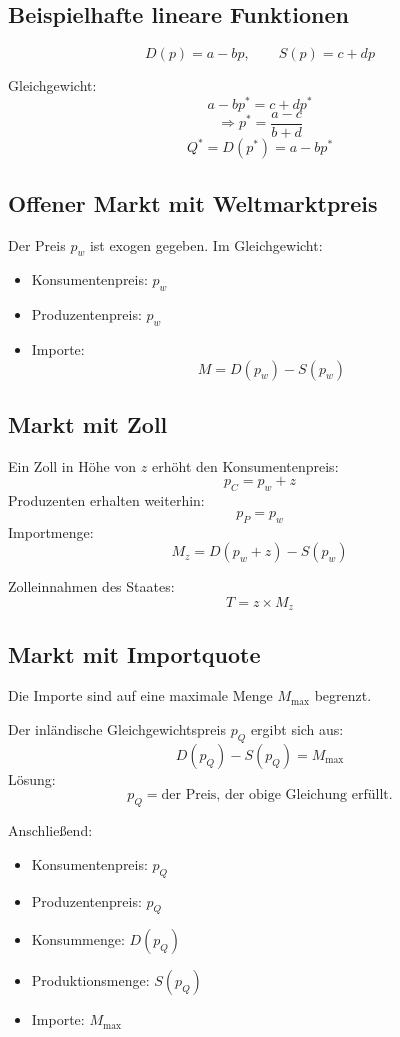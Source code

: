 \subsection*{Beispielhafte lineare Funktionen}
\[
D(p) = a - b p, \qquad S(p) = c + d p
\]

Gleichgewicht:
\[
a - b p^* = c + d p^*
\]
\[
\Rightarrow p^* = \frac{a - c}{b + d}
\]
\[
Q^* = D(p^*) = a - b p^*
\]

\subsection{Offener Markt mit Weltmarktpreis}

Der Preis \( p_w \) ist exogen gegeben.
Im Gleichgewicht:
\begin{itemize}
    \item Konsumentenpreis: \( p_w \)
    \item Produzentenpreis: \( p_w \)
    \item Importe:
    \[
    M = D(p_w) - S(p_w)
    \]
\end{itemize}

\subsection{Markt mit Zoll}

Ein Zoll in Höhe von \( z \) erhöht den Konsumentenpreis:
\[
p_C = p_w + z
\]
Produzenten erhalten weiterhin:
\[
p_P = p_w
\]
Importmenge:
\[
M_z = D(p_w + z) - S(p_w)
\]

Zolleinnahmen des Staates:
\[
T = z \times M_z
\]

\subsection{Markt mit Importquote}

Die Importe sind auf eine maximale Menge \( M_{\text{max}} \) begrenzt.

Der inländische Gleichgewichtspreis \( p_Q \) ergibt sich aus:
\[
D(p_Q) - S(p_Q) = M_{\text{max}}
\]
Lösung:
\[
p_Q = \text{der Preis, der obige Gleichung erfüllt.}
\]

Anschließend:
\begin{itemize}
    \item Konsumentenpreis: \( p_Q \)
    \item Produzentenpreis: \( p_Q \)
    \item Konsummenge: \( D(p_Q) \)
    \item Produktionsmenge: \( S(p_Q) \)
    \item Importe: \( M_{\text{max}} \)
\end{itemize}

